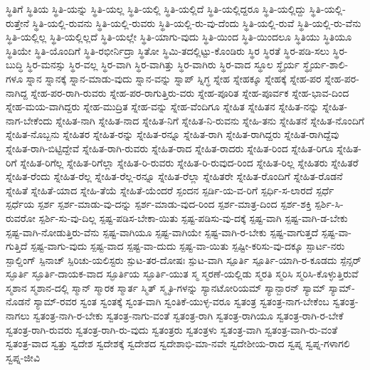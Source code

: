 {ಸ್ಥಿತಿಗೆ
ಸ್ಥಿತಿಯ
ಸ್ಥಿತಿ-ಯನ್ನು
ಸ್ಥಿತಿ-ಯಲ್ಲ
ಸ್ಥಿತಿ-ಯಲ್ಲಿ
ಸ್ಥಿತಿ-ಯಲ್ಲಿದೆ
ಸ್ಥಿತಿ-ಯಲ್ಲಿದ್ದರೂ
ಸ್ಥಿತಿ-ಯಲ್ಲಿದ್ದು
ಸ್ಥಿತಿ-ಯಲ್ಲಿ-ರುತ್ತೇನೆ
ಸ್ಥಿತಿ-ಯಲ್ಲಿ-ರುವನು
ಸ್ಥಿತಿ-ಯಲ್ಲಿ-ರುವರು
ಸ್ಥಿತಿ-ಯಲ್ಲಿ-ರು-ವು-ದೆಂದು
ಸ್ಥಿತಿ-ಯಲ್ಲಿ-ರುವೆ
ಸ್ಥಿತಿ-ಯಲ್ಲಿ-ರು-ವೆನು
ಸ್ಥಿತಿ-ಯಲ್ಲಿಲ್ಲ
ಸ್ಥಿತಿ-ಯಲ್ಲಿಲ್ಲದೆ
ಸ್ಥಿತಿ-ಯಲ್ಲೇ
ಸ್ಥಿತಿ-ಯಾಗು-ವುದು
ಸ್ಥಿತಿ-ಯಿಂದ
ಸ್ಥಿತಿ-ಯಿಂದಲೂ
ಸ್ಥಿತಿಯು
ಸ್ಥಿತಿಯೂ
ಸ್ಥಿತಿಯೇ
ಸ್ಥಿತಿ-ಯೊಂದಿಗೆ
ಸ್ಥಿತಿ-ರಭೀರ್ನಿದ್ರಾ
ಸ್ಥಿತೋ
ಸ್ಥಿಮಿ-ತದಲ್ಲಿಟ್ಟು-ಕೊಂಡಿರು
ಸ್ಥಿರ
ಸ್ಥಿರತೆ
ಸ್ಥಿರ-ಪಡಿ-ಸಲು
ಸ್ಥಿರ-ಬುದ್ಧಿ
ಸ್ಥಿರ-ಮನಸ್ಸು
ಸ್ಥಿರ-ವಲ್ಲ
ಸ್ಥಿರ-ವಾಗಿ
ಸ್ಥಿರ-ವಾಗಿತ್ತು
ಸ್ಥಿರ-ವಾಗಿರು
ಸ್ಥಿರ-ವಾದ
ಸ್ಥೂಲ
ಸ್ಥೈರ್ಯ
ಸ್ಥೈರ್ಯ-ಶಾಲಿ-ಗಳೂ
ಸ್ನಾನ
ಸ್ನಾನಕ್ಕೆ
ಸ್ನಾನ-ಮಾಡು-ವುದು
ಸ್ನಾನ-ವನ್ನು
ಸ್ನಾಪ್
ಸ್ನಿಗ್ಧ
ಸ್ನೇಹ
ಸ್ನೇಹಕ್ಕೂ
ಸ್ನೇಹಕ್ಕೆ
ಸ್ನೇಹ-ಪರ
ಸ್ನೇಹ-ಪರ-ನಾಗಿದ್ದ
ಸ್ನೇಹ-ಪರ-ರಾಗಿ-ರುವರು
ಸ್ನೇಹ-ಪರ-ರಾಗುತ್ತಿರು-ವರು
ಸ್ನೇಹ-ಪೂರಿತ
ಸ್ನೇಹ-ಪೂರ್ವಕ
ಸ್ನೇಹ-ಭಾವ-ದಿಂದ
ಸ್ನೇಹ-ಮಯ-ವಾಗಿದ್ದರು
ಸ್ನೇಹ-ಮುದ್ರಿತ
ಸ್ನೇಹ-ವನ್ನು
ಸ್ನೇಹ-ವೆಂದಿಗೂ
ಸ್ನೇಹಿತ
ಸ್ನೇಹಿತನ
ಸ್ನೇಹಿತ-ನನ್ನು
ಸ್ನೇಹಿತ-ನಾಗ-ಬೇಕೆಂದು
ಸ್ನೇಹಿತ-ನಾಗಿ
ಸ್ನೇಹಿತ-ನಾದ
ಸ್ನೇಹಿತ-ನಿಗೆ
ಸ್ನೇಹಿತ-ನಿ-ರುವನು
ಸ್ನೇಹಿ-ತನು
ಸ್ನೇಹಿತನೆ
ಸ್ನೇಹಿತ-ನೊಂದಿಗೆ
ಸ್ನೇಹಿತ-ನೊಬ್ಬನು
ಸ್ನೇಹಿತರ
ಸ್ನೇಹಿತ-ರನ್ನು
ಸ್ನೇಹಿತ-ರನ್ನೂ
ಸ್ನೇಹಿತ-ರಾಗಿ
ಸ್ನೇಹಿತ-ರಾಗಿದ್ದರು
ಸ್ನೇಹಿತ-ರಾಗಿದ್ದೆವು
ಸ್ನೇಹಿತ-ರಾಗಿ-ಬಿಟ್ಟಿದ್ದೇವೆ
ಸ್ನೇಹಿತ-ರಾಗಿ-ರುವರು
ಸ್ನೇಹಿತ-ರಾದ
ಸ್ನೇಹಿತ-ರಾದರು
ಸ್ನೇಹಿತ-ರಿಂದ
ಸ್ನೇಹಿತ-ರಿಗೂ
ಸ್ನೇಹಿತ-ರಿಗೆ
ಸ್ನೇಹಿತ-ರಿಗೆಲ್ಲ
ಸ್ನೇಹಿತ-ರಿಗೆಲ್ಲಾ
ಸ್ನೇಹಿತ-ರಿ-ರುವರು
ಸ್ನೇಹಿತ-ರಿ-ರುವುದ-ರಿಂದ
ಸ್ನೇಹಿತ-ರಿಲ್ಲ
ಸ್ನೇಹಿತರು
ಸ್ನೇಹಿತರೆ
ಸ್ನೇಹಿತ-ರೆಂದು
ಸ್ನೇಹಿತ-ರೆಲ್ಲ
ಸ್ನೇಹಿತ-ರೆಲ್ಲ-ರನ್ನೂ
ಸ್ನೇಹಿತ-ರೆಲ್ಲಾ
ಸ್ನೇಹಿತರೇ
ಸ್ನೇಹಿತ-ರೊಂದಿಗೆ
ಸ್ನೇಹಿತ-ರೊಡನೆ
ಸ್ನೇಹಿತೆ
ಸ್ನೇಹಿತೆ-ಯಾದ
ಸ್ನೇಹಿ-ತೆಯೆ
ಸ್ನೇಹಿತೆ-ಯೆಂದರೆ
ಸ್ಪಂದನ
ಸ್ಪರ್ಡಿ-ಯ-ವ-ರಿಗೆ
ಸ್ಪರ್ಧಿ-ಸ-ಲಾರದೆ
ಸ್ಪರ್ಧೆ
ಸ್ಪರ್ಧೆಯ
ಸ್ಪರ್ಶ
ಸ್ಪರ್ಶ-ಮಾಡು-ವು-ದನ್ನು
ಸ್ಪರ್ಶ-ಮಾಡು-ವುದ-ರಿಂದ
ಸ್ಪರ್ಶ-ಮಾತ್ರ-ದಿಂದ
ಸ್ಪರ್ಶ-ಶಕ್ತಿ
ಸ್ಪರ್ಶಿ-ಸಿ-ರುವರೋ
ಸ್ಪರ್ಶಿ-ಸು-ವು-ದಿಲ್ಲ
ಸ್ಪಷ್ಟ-ಪಡಿಸ-ಬೇಕಾ-ಯಿತು
ಸ್ಪಷ್ಟ-ಪಡಿಸು-ವು-ದಕ್ಕೆ
ಸ್ಪಷ್ಟ-ವಾಗಿ
ಸ್ಪಷ್ಟ-ವಾಗಿ-ಡ-ಬೇಕು
ಸ್ಪಷ್ಟ-ವಾಗಿ-ನೋಡುತ್ತಿರು-ವೆನು
ಸ್ಪಷ್ಟ-ವಾಗಿಯೂ
ಸ್ಪಷ್ಟ-ವಾಗಿಯೇ
ಸ್ಪಷ್ಟ-ವಾಗಿ-ರ-ಬೇಕು
ಸ್ಪಷ್ಟ-ವಾಗುತ್ತದೆ
ಸ್ಪಷ್ಟ-ವಾ-ಗುತ್ತಿದೆ
ಸ್ಪಷ್ಟ-ವಾಗು-ವುದು
ಸ್ಪಷ್ಟ-ವಾದ
ಸ್ಪಷ್ಟ-ವಾ-ದುದು
ಸ್ಪಷ್ಟ-ವಾ-ಯಿತು
ಸ್ಪಷ್ಟೀ-ಕರಿಸು-ವು-ದಕ್ಕೂ
ಸ್ಪಾರ್ಟ-ನರು
ಸ್ಪಾಲ್ಡಿಂಗ್
ಸ್ಪಿನಾಚ್
ಸ್ಪಿರಿಚು-ಯಲಿಸ್ಟರು
ಸ್ಪುಟ-ತರ-ದೋಷಃ
ಸ್ಪುಟ-ವಾಗಿ
ಸ್ಪೂರ್ತಿ
ಸ್ಪೂರ್ತಿ-ಯಾಗಿ-ರ-ಕೂಡದು
ಸ್ಪೆನ್ಸರ್
ಸ್ಫೂರ್ತಿ
ಸ್ಫೂರ್ತಿ-ದಾಯಕ-ವಾದ
ಸ್ಫೂರ್ತಿಯ
ಸ್ಫೂರ್ತಿ-ಯುತ
ಸ್ಮ
ಸ್ಮರಣೆ-ಯಲ್ಲಿಡು
ಸ್ಮರತಿ
ಸ್ಮರಿಸಿ
ಸ್ಮರಿಸಿ-ಕೊಳ್ಳುತ್ತಿರುವೆ
ಸ್ಮಶಾನ
ಸ್ಮಶಾನ-ದಲ್ಲಿ
ಸ್ಮಾನ್
ಸ್ಮಾರಕ
ಸ್ಮಾರ್ತ
ಸ್ಮಿತ್
ಸ್ಮೃತಿ-ಗಳನ್ನು
ಸ್ಯಾನಟೋರಿಯಮ್
ಸ್ಯಾನ್ಬಾರನ್
ಸ್ಯಾಮ್
ಸ್ಯಾಮ್-ನೊಡನೆ
ಸ್ಯಾಮ್-ರವರ
ಸ್ವಂತ
ಸ್ವಂತಕ್ಕೆ
ಸ್ವಂತ-ವಾಗಿ
ಸ್ವಂತಿಕೆ-ಯುಳ್ಳ-ವರೂ
ಸ್ವತಂತ್ರ
ಸ್ವತಂತ್ರ-ನಾಗ-ಬೇಕೆಂಬ
ಸ್ವತಂತ್ರ-ನಾಗಲು
ಸ್ವತಂತ್ರ-ನಾಗಿ-ರ-ಬೇಕು
ಸ್ವತಂತ್ರ-ನಾಗು-ವಂತೆ
ಸ್ವತಂತ್ರ-ರಾಗಿ
ಸ್ವತಂತ್ರ-ರಾಗಿಯೂ
ಸ್ವತಂತ್ರ-ರಾಗಿ-ರ-ಬೇಕೆ
ಸ್ವತಂತ್ರ-ರಾಗಿ-ರುವರು
ಸ್ವತಂತ್ರ-ರಾಗಿ-ರು-ವುದು
ಸ್ವತಂತ್ರರು
ಸ್ವತಂತ್ರಳು
ಸ್ವತಂತ್ರ-ವಾಗಿ
ಸ್ವತಂತ್ರ-ವಾಗಿ-ರು-ವಂತೆ
ಸ್ವತಂತ್ರ-ವಾದ
ಸ್ವತ್ತು
ಸ್ವದೇಶ
ಸ್ವದೇಶಕ್ಕೆ
ಸ್ವದೇಶದ
ಸ್ವದೇಶಾಭಿ-ಮಾ-ನವೇ
ಸ್ವದೇಶೀಯ-ರಾದ
ಸ್ವಪ್ನ
ಸ್ವಪ್ನ-ಗಳಾಗಲಿ
ಸ್ವಪ್ನ-ಜೀವಿ
}
